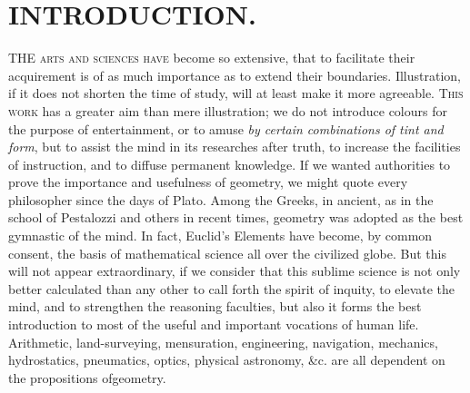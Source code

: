     \chapter{INTRODUCTION.}
    \lettrine[lines=2]{T}{HE arts and sciences have} become so extensive,
    that to facilitate their acquirement is of as much importance as to
    extend their boundaries. Illustration, if it does not shorten the time
    of study, will at least make it more agreeable. \textsc{This work} has
    a greater aim than mere illustration; we do not introduce colours for
    the purpose of entertainment, or to amuse \textit{by certain
    combinations of tint and form}, but to assist the mind in its
    researches after truth, to increase the facilities of instruction, and
    to diffuse permanent knowledge. If we wanted authorities to prove the
    importance and usefulness of geometry, we might quote every
    philosopher since the days of Plato. Among the Greeks, in ancient, as
    in the school of Pestalozzi and others in recent times, geometry was
    adopted as the best gymnastic of the mind. In fact, Euclid's Elements
    have become, by common consent, the basis of mathematical science all
    over the civilized globe. But this will not appear extraordinary, if
    we consider that this sublime science is not only better calculated
    than any other to call forth the spirit of inquity, to elevate the
    mind, and to strengthen the reasoning faculties, but also it forms the
    best introduction to most of the useful and important vocations of
    human life. Arithmetic, land-surveying, mensuration, engineering,
    navigation, mechanics, hydrostatics, pneumatics, optics, physical
    astronomy, \&c. are all dependent on the propositions ofgeometry. 

